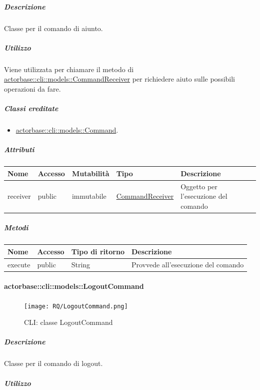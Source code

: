 \documentclass{scalatekids-article}
\begin{document}
\subparagraph{Descrizione}

Classe per il comando di aiunto.

\subparagraph{Utilizzo}
Viene utilizzata per chiamare il metodo di
\hyperref[sec:actorbase::cli::models::CommandReceiver]{actorbase::cli::models::CommandReceiver} per richiedere aiuto sulle possibili operazioni da fare.

\subparagraph{Classi ereditate}
\begin{itemize}
\item \hyperref[sec:actorbase::cli::models::Command]{actorbase::cli::models::Command}.
\end{itemize}

\subparagraph{Attributi}

\begin{tabular}{| p{1cm} | p{1.5cm} | p{2cm} | p{4cm} | p{8.5cm} |}
  \hline
  Nome & Accesso & Mutabilità & Tipo & Descrizione\\
  \hline
  receiver & public & immutabile & \hyperref[sec:actorbase::cli::models::CommandReceiver]{CommandReceiver} & Oggetto per l'esecuzione del comando \\
  \hline
\end{tabular}

\subparagraph{Metodi}

\begin{tabular}{| l | l | l | l |}
  \hline
  Nome & Accesso & Tipo di ritorno & Descrizione\\
  \hline
  execute & public & String & Provvede all'esecuzione del comando\\
  \hline
\end{tabular}

\paragraph{actorbase::cli::models::LogoutCommand}
\label{sec:actorbase::cli::models::LogoutCommand}

\begin{figure}[H]
  \begin{center}
    \texttt{[image: RQ/LogoutCommand.png]}
    \caption{CLI: classe LogoutCommand}
  \end{center}
\end{figure}

\subparagraph{Descrizione}

Classe per il comando di logout.

\subparagraph{Utilizzo}
\end{document}
